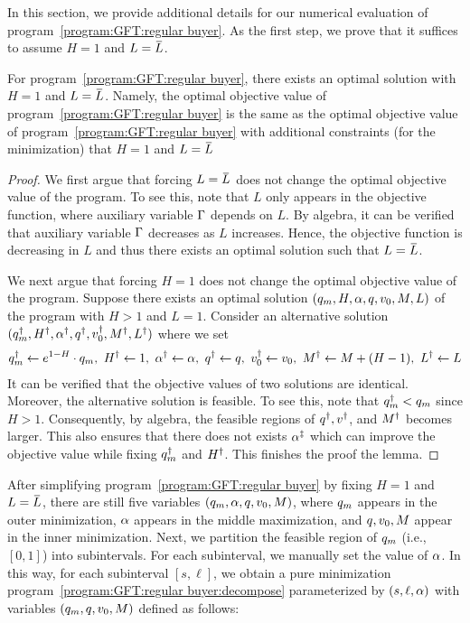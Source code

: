In this section, we provide additional details for our numerical evaluation of program~\ref{program:GFT:regular buyer}.
As the first step, we prove that it suffices to assume $H = 1$ and $L = \LOverBar$.
\begin{lemma}
\label{lem:regular buyer program:reducing variables}
    For program~\ref{program:GFT:regular buyer}, there exists an optimal solution with $H = 1$ and $L = \LOverBar$. Namely, the optimal objective value of program~\ref{program:GFT:regular buyer} is the same as the optimal objective value of program~\ref{program:GFT:regular buyer} with additional constraints (for the minimization) that $H = 1$ and $L = \LOverBar$
\end{lemma}
\begin{proof}
    We first argue that forcing $L = \LOverBar$ does not change the optimal objective value of the program. To see this, note that $L$ only appears in the objective function, where auxiliary variable $\Gamma$ depends on $L$. By algebra, it can be verified that auxiliary variable $\Gamma$ decreases as $L$ increases. Hence, the objective function is decreasing in $L$ and thus there exists an optimal solution such that $L = \LOverBar$.

    We next argue that forcing $H = 1$ does not change the optimal objective value of the program. Suppose there exists an optimal solution $(q_m, H, \alpha, q, v_0, M, L)$ of the program with $H > 1$ and $L = 1$. Consider an alternative solution $(q_m^\dagger, H^\dagger, \alpha^\dagger, q^\dagger, v_0^\dagger, M^\dagger, L^\dagger)$ where we set 
    \begin{align*}
        q_m^\dagger \gets e^{1-H}\cdot q_m,~
        H^\dagger \gets 1,~
        \alpha^\dagger \gets \alpha,~
        q^\dagger \gets q,~
        v_0^\dagger \gets v_0,~
        M^\dagger \gets M + (H - 1),~
        L^\dagger \gets L
    \end{align*} 
    It can be verified that the objective values of two solutions are identical. Moreover, the alternative solution is feasible. To see this, note that $q_m^\dagger < q_m$ since $H > 1$. Consequently, by algebra, the feasible regions of $q^\dagger, v^\dagger$, and $M^\dagger$ becomes larger. This also ensures that there does not exists $\alpha^\ddagger$ which can improve the objective value while fixing $q_m^\dagger$ and $H^\dagger$. This finishes the proof the lemma.
\end{proof}
After simplifying program~\ref{program:GFT:regular buyer} by fixing $H = 1$ and $L = \LOverBar$, there are still five variables $(q_m, \alpha,q,v_0, M)$, where $q_m$ appears in the outer minimization, $\alpha$ appears in the middle maximization, and $q,v_0, M$ appear in the inner minimization. Next, we partition the feasible region of $q_m$ (i.e., $[0, 1]$) into subintervals. For each subinterval, we manually set the value of $\alpha$. In this way, for each subinterval $[s, \ell]$, we obtain a pure minimization program~\ref{program:GFT:regular buyer:decompose} parameterized by $(s,\ell, \alpha)$ with variables $(q_m,q,v_0, M)$ defined as follows:
